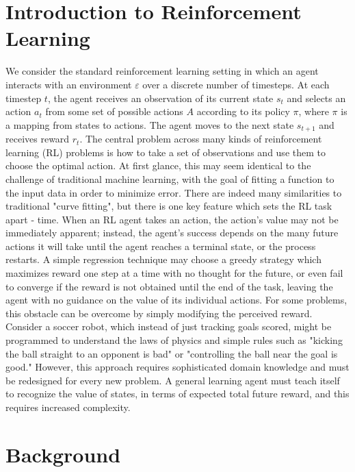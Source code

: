 \documentclass[journal,onecolumn]{IEEEtran}
\begin{document}
\section{Introduction to Reinforcement Learning}
We consider the standard reinforcement learning setting in which an agent interacts with an environment $\varepsilon$ over a discrete number of timesteps. At each timestep $t$, the agent receives an observation of its current state $s_{t}$  and selects an action $a_{t}$  from some set of possible actions $A$ according to its policy $\pi$, where $\pi$ is a mapping from states to actions. The agent moves to the next state $s_{t+1}$ and receives reward $r_{t}$. The central problem across many kinds of reinforcement learning (RL) problems is how to take a set of observations and use them to choose the optimal action.  At first glance, this may seem identical to the challenge of traditional machine learning, with the goal of fitting a function to the input data in order to minimize error.  There are indeed many similarities to traditional "curve fitting", but there is one key feature which sets the RL task apart - time.  When an RL agent takes an action, the action's value may not be immediately apparent; instead, the agent's success depends on the many future actions it will take until the agent reaches a terminal state, or the process restarts.  A simple regression technique may choose a greedy strategy which maximizes reward one step at a time with no thought for the future, or even fail to converge if the reward is not obtained until the end of the task, leaving the agent with no guidance on the value of its individual actions.  For some problems, this obstacle can be overcome by simply modifying the perceived reward. Consider a soccer robot, which instead of just tracking goals scored, might be programmed to understand the laws of physics and simple rules such as "kicking the ball straight to an opponent is bad" or "controlling the ball near the goal is good."  However, this approach requires sophisticated domain knowledge and must be redesigned for every new problem.  A general learning agent must teach itself to recognize the value of states, in terms of expected total future reward, and this requires increased complexity.
\section{Background}
\end{document}

